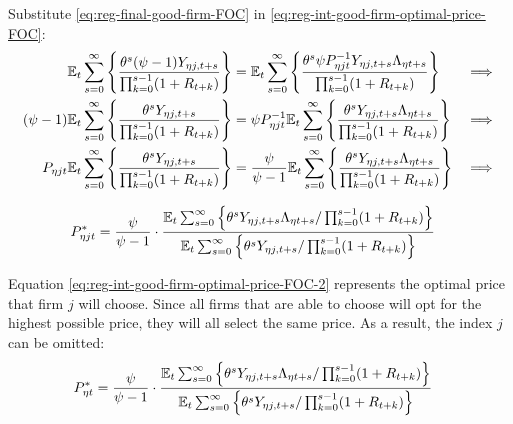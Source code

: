 \documentclass[
	thesis.tex
	]{subfiles}
\begin{document}

Substitute \ref{eq:reg-final-good-firm-FOC} in \ref{eq:reg-int-good-firm-optimal-price-FOC}:
\begin{alignat}{2}
	{\mathbb{E}_{t}} \sum_{s=0}^{\infty} \Bigg\{ \frac{\theta^s (\psi-1) Y_{\eta j,t+s}}{\prod_{k=0}^{s-1}(1+R_{t+k})} \Bigg\} &= {\mathbb{E}_{t}} \sum_{s=0}^{\infty} \Bigg\{ \frac{\theta^s \psi P_{\eta jt}^{-1} Y_{\eta j,t+s} \Lambda_{\eta t+s}}{\prod_{k=0}^{s-1}(1+R_{t+k})}  \Bigg\} &\implies \nonumber \\
	(\psi-1) {\mathbb{E}_{t}} \sum_{s=0}^{\infty} \Bigg\{ \frac{\theta^s Y_{\eta j,t+s}}{\prod_{k=0}^{s-1}(1+R_{t+k})} \Bigg\} &= \psi P_{\eta jt}^{-1} {\mathbb{E}_{t}} \sum_{s=0}^{\infty} \Bigg\{ \frac{\theta^s Y_{\eta j,t+s} \Lambda_{\eta t+s}}{\prod_{k=0}^{s-1}(1+R_{t+k})}  \Bigg\} &\implies \nonumber \\
	P_{\eta jt} {\mathbb{E}_{t}} \sum_{s=0}^{\infty} \Bigg\{ \frac{\theta^s Y_{\eta j,t+s}}{\prod_{k=0}^{s-1}(1+R_{t+k})} \Bigg\} &= \frac{\psi}{\psi-1} {\mathbb{E}_{t}} \sum_{s=0}^{\infty} \Bigg\{ \frac{\theta^s Y_{\eta j,t+s} \Lambda_{\eta t+s}}{\prod_{k=0}^{s-1}(1+R_{t+k})}  \Bigg\} &\implies \nonumber
\end{alignat}

\vspace*{-1cm}

\begin{align}
	\label{eq:reg-int-good-firm-optimal-price-FOC-2}
	P_{\eta jt}^\ast &= 
	\frac{\psi}{\psi-1} \cdot
	\frac{
		{\mathbb{E}_{t}} \sum_{s=0}^{\infty} \left\{ 
		\theta^s Y_{\eta j,t+s} \Lambda_{\eta t+s} / \prod_{k=0}^{s-1}(1+R_{t+k}) \right\} } {{\mathbb{E}_{t}} \sum_{s=0}^{\infty} \left\{
		\theta^s Y_{\eta j,t+s} / \prod_{k=0}^{s-1}(1+R_{t+k}) \right\}}
\end{align}


Equation \ref{eq:reg-int-good-firm-optimal-price-FOC-2} represents the optimal price that firm $j$ will choose. Since all firms that are able to choose will opt for the highest possible price, they will all select the same price. As a result, the index $j$ can be omitted:
\begin{align}
	\label{eq:reg-int-good-firm-optimal-price-FOC-3}
	P_{\eta t}^\ast &= 
	\frac{\psi}{\psi-1} \cdot
	\frac{
		{\mathbb{E}_{t}} \sum_{s=0}^{\infty} \left\{ 
		\theta^s Y_{\eta j,t+s} \Lambda_{\eta t+s} / \prod_{k=0}^{s-1}(1+R_{t+k}) \right\} } {{\mathbb{E}_{t}} \sum_{s=0}^{\infty} \left\{
		\theta^s Y_{\eta j,t+s} / \prod_{k=0}^{s-1}(1+R_{t+k}) \right\}}
\end{align}

\end{document}
